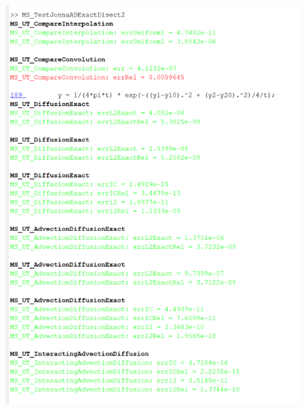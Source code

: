\documentclass[11pt, a4paper]{article}
\theoremstyle{definition}
\begin{document}
	\begin{figure}[h]
		\centering
		\includegraphics[scale=0.7]{rhoDyWedge.png}

\end{figure}
\end{document}
